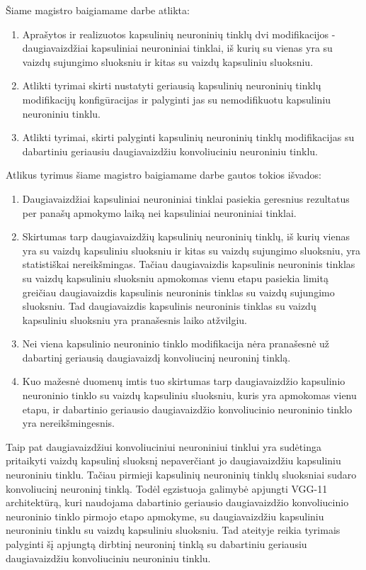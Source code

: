 
Šiame magistro baigiamame darbe atlikta:

\begin{enumerate}
	\item Aprašytos ir realizuotos kapsulinių neuroninių tinklų dvi modifikacijos - daugiavaizdžiai kapsuliniai neuroniniai tinklai, iš kurių su vienas yra su vaizdų sujungimo sluoksniu ir kitas su vaizdų kapsuliniu sluoksniu.
	\item Atlikti tyrimai skirti nustatyti geriausią kapsulinių neuroninių tinklų modifikacijų konfigūracijas ir palyginti jas su nemodifikuotu kapsuliniu neuroniniu tinklu.
	\item Atlikti tyrimai, skirti palyginti kapsulinių neuroninių tinklų modifikacijas su dabartiniu geriausiu daugiavaizdžiu konvoliuciniu neuroniniu tinklu.
\end{enumerate}

Atlikus tyrimus šiame magistro baigiamame darbe gautos tokios išvados:

\begin{enumerate}
	\item Daugiavaizdžiai kapsuliniai neuroniniai tinklai pasiekia geresnius rezultatus per panašų apmokymo laiką nei kapsuliniai neuroniniai tinklai.
	\item Skirtumas tarp daugiavaizdžių kapsulinių neuroninių tinklų, iš kurių vienas yra su vaizdų kapsuliniu sluoksniu ir kitas su vaizdų sujungimo sluoksniu, yra statistiškai nereikšmingas. Tačiau daugiavaizdis kapsulinis neuroninis tinklas su vaizdų kapsuliniu sluoksniu apmokomas vienu etapu pasiekia limitą greičiau daugiavaizdis kapsulinis neuroninis tinklas su vaizdų sujungimo sluoksniu. Tad daugiavaizdis kapsulinis neuroninis tinklas su vaizdų kapsuliniu sluoksniu yra pranašesnis laiko atžvilgiu.
	\item Nei viena kapsulinio neuroninio tinklo modifikacija nėra pranašesnė už dabartinį geriausią daugiavaizdį konvoliucinį neuroninį tinklą.
	\item Kuo mažesnė duomenų imtis tuo skirtumas tarp daugiavaizdžio kapsulinio neuroninio tinklo su vaizdų kapsuliniu sluoksniu, kuris yra apmokomas vienu etapu, ir dabartinio geriausio daugiavaizdžio konvoliucinio neuroninio tinklo yra nereikšmingesnis.
\end{enumerate}

Taip pat daugiavaizdžiui konvoliuciniui neuroniniui tinklui yra sudėtinga pritaikyti vaizdų kapsulinį sluoksnį nepaverčiant jo daugiavaizdžiu kapsuliniu neuroniniu tinklu. Tačiau pirmieji kapsulinių neuroninių tinklų sluoksniai sudaro konvoliucinį neuroninį tinklą. Todėl egzistuoja galimybė apjungti VGG-11 architektūrą, kuri naudojama dabartinio geriausio daugiavaizdžio konvoliucinio neuroninio tinklo pirmojo etapo apmokyme, su daugiavaizdžiu kapsuliniu neuroniniu tinklu su vaizdų kapsuliniu sluoksniu. Tad ateityje reikia tyrimais palyginti šį apjungtą dirbtinį neuroninį tinklą su dabartiniu geriausiu daugiavaizdžiu konvoliuciniu neuroniniu tinklu.
